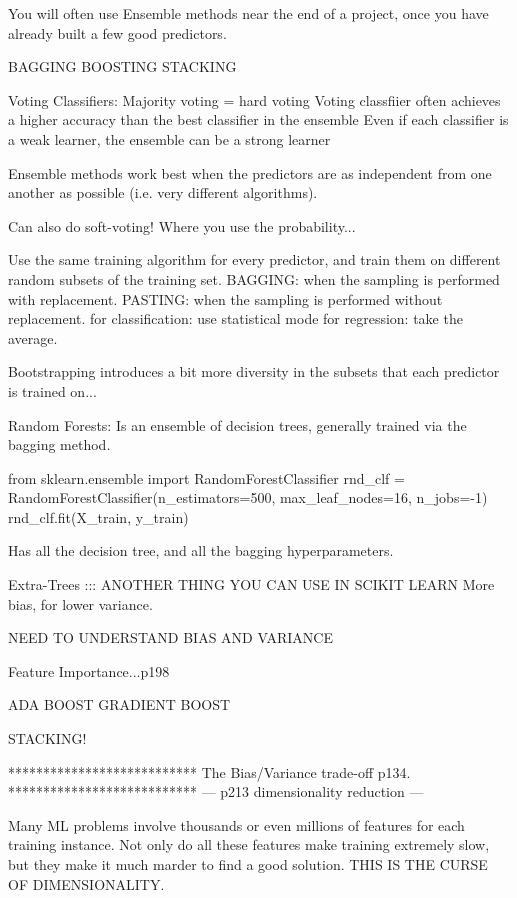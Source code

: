 You will often use Ensemble methods near the end of a project,
once you have already built a few good predictors.

BAGGING
BOOSTING
STACKING

Voting Classifiers:
Majority voting = hard voting
Voting classfiier often achieves a higher accuracy than the best classifier in the ensemble
Even if each classifier is a weak learner,
the ensemble can be a strong learner

Ensemble methods work best when the predictors are
as independent from one another as possible (i.e. very different algorithms).

Can also do soft-voting! Where you use the probability...


Use the same training algorithm for every predictor,
and train them on different random subsets of the training set.
BAGGING: when the sampling is performed with replacement.
PASTING: when the sampling is performed without replacement.
for classification: use statistical mode
for regression: take the average.

Bootstrapping introduces a bit more diversity in the subsets that each predictor is trained on...

Random Forests:
Is an ensemble of decision trees, generally trained via the bagging method.

from sklearn.ensemble import RandomForestClassifier
rnd_clf = RandomForestClassifier(n_estimators=500, max_leaf_nodes=16, n_jobs=-1)
rnd_clf.fit(X_train, y_train)

Has all the decision tree, and all the bagging hyperparameters.

Extra-Trees ::: ANOTHER THING YOU CAN USE IN SCIKIT LEARN
More bias, for lower variance.

NEED TO UNDERSTAND BIAS AND VARIANCE

Feature Importance...p198

ADA BOOST
GRADIENT BOOST

STACKING!





***************************
The Bias/Variance trade-off
p134.
***************************
---
p213 dimensionality reduction
---

Many ML problems involve thousands or even millions of features for each training instance.
Not only do all these features make training extremely slow,
but they make it much marder to find a good solution.
THIS IS THE CURSE OF DIMENSIONALITY.

